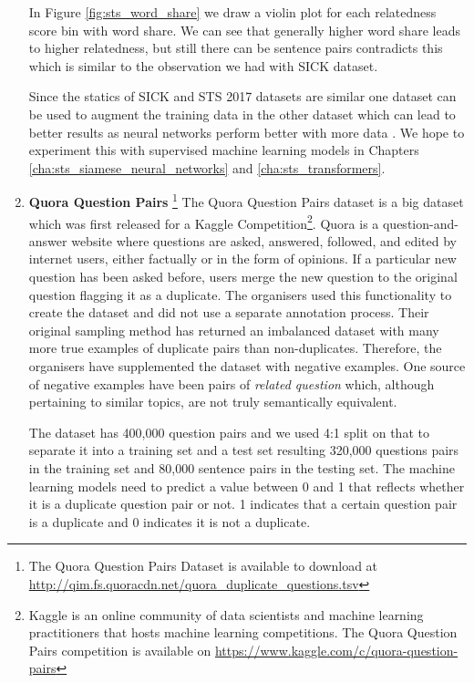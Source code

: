 \begin{enumerate}
In Figure \ref{fig:sts_word_share} we draw a violin plot for each relatedness score bin with word share. We can see that generally higher word share leads to higher relatedness, but still there can be sentence pairs contradicts this which is similar to the observation we had with SICK dataset. 

Since the statics of SICK and STS 2017 datasets are similar one dataset can be used to augment the training data in the other dataset which can lead to better results as neural networks perform better with more data \cite{wang-etal-2020-evaluating,info:doi/10.2196/23086}. We hope to experiment this with supervised machine learning models in Chapters \ref{cha:sts_siamese_neural_networks} and \ref{cha:sts_transformers}.
  
 \item \textbf{Quora Question Pairs} \footnote{The Quora Question Pairs Dataset is available to download at \url{http://qim.fs.quoracdn.net/quora_duplicate_questions.tsv}} The Quora Question Pairs dataset is a big dataset which was first released for a Kaggle Competition\footnote{Kaggle is an online community of data scientists and machine learning practitioners that hosts machine learning competitions. The Quora Question Pairs competition is available on \url{https://www.kaggle.com/c/quora-question-pairs}}. Quora is a question-and-answer website where questions are asked, answered, followed, and edited by internet users, either factually or in the form of opinions. If a particular new question has been asked before, users merge the new question to the original question flagging it as a duplicate. The organisers used this functionality to create the dataset and did not use a separate annotation process. Their original sampling method has returned an imbalanced dataset with many more true examples of duplicate pairs than non-duplicates. Therefore, the organisers have supplemented the dataset with negative examples. One source of negative examples 
 have been pairs of \textit{related question} which, although pertaining to similar topics, are not truly semantically equivalent. 
 
 The dataset has 400,000 question pairs and we used 4:1 split on that to separate it into a training set and a test set resulting 320,000 questions pairs in the training set and  80,000 sentence pairs in the testing set. The machine learning models need to predict a value between 0 and 1 that reflects whether it is a duplicate question pair or not. 1 indicates that a certain question pair is a duplicate and 0 indicates it is not a duplicate. 
 

\end{enumerate}
